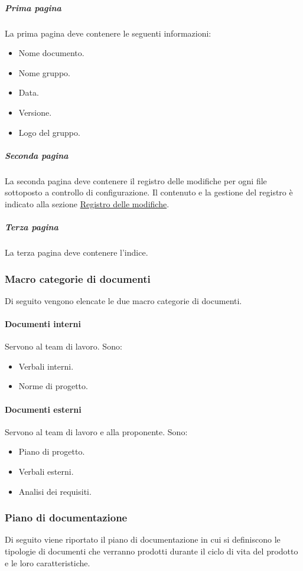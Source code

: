\subparagraph{Prima pagina}
La prima pagina deve contenere le seguenti informazioni:
\begin{itemize}
    \item Nome documento.     
    \item Nome gruppo.
    \item Data. 
    \item Versione.
    \item Logo del gruppo.
\end{itemize}

\subparagraph{Seconda pagina}
La seconda pagina deve contenere il registro delle modifiche per ogni file sottoposto a controllo di configurazione.
Il contenuto e la gestione del registro è indicato alla sezione \hyperref[par:registro_delle_modifiche]{Registro delle modifiche}.

\subparagraph{Terza pagina}
La terza pagina deve contenere l'indice.

\subsubsection{Macro categorie di documenti}
Di seguito vengono elencate le due macro categorie di documenti. 

\paragraph{Documenti interni}
Servono al team di lavoro.
Sono:
\begin{itemize}
    \item Verbali interni.
    \item Norme di progetto.
\end{itemize}

\paragraph{Documenti esterni}
Servono al team di lavoro e alla proponente.
Sono:
\begin{itemize}
    \item Piano di progetto.
    \item Verbali esterni.
    \item Analisi dei requisiti.
\end{itemize}

\subsubsection{Piano di documentazione}
Di seguito viene riportato il piano di documentazione in cui si definiscono le tipologie di documenti che verranno prodotti durante il ciclo di vita del prodotto e le loro caratteristiche.

